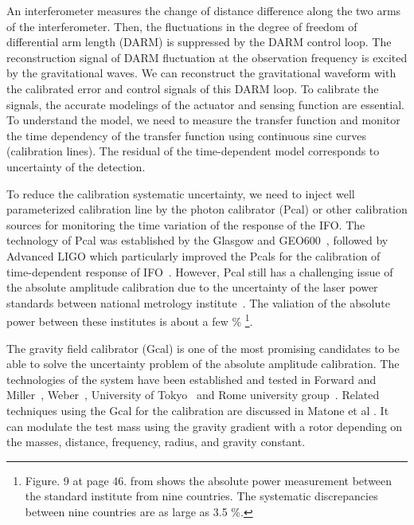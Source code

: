 \documentclass[A4]{spie}  %
\begin{document}

An interferometer measures the change of distance difference along the two arms of the interferometer. Then, the fluctuations in the degree of freedom of differential arm length (DARM) is suppressed by the DARM control loop. The reconstruction signal of DARM fluctuation at the observation frequency is excited by the gravitational waves. We can reconstruct the gravitational waveform with the calibrated error and control signals of this DARM loop. To calibrate the signals, the accurate modelings of the actuator and sensing function are essential. To understand the model, we need to measure the transfer function and monitor the time dependency of the transfer function using continuous sine curves (calibration lines). The residual of the time-dependent model corresponds to uncertainty of the detection.

To reduce the calibration systematic uncertainty, we need to inject well parameterized calibration line by the photon calibrator (Pcal) or other calibration sources for monitoring the time variation of the response of the IFO. The technology of Pcal was established by the Glasgow and GEO600~\cite{CLUBLEY200185,MOSSAVI20061}, followed by Advanced LIGO which particularly improved the Pcals for the calibration of time-dependent response of IFO~\cite{0264-9381-32-2-024001, doi:10.1063/1.4967303,0264-9381-27-8-084024,0264-9381-26-24-245011,0264-9381-32-2-024001}. However, Pcal still has a challenging issue of the absolute amplitude calibration due to the uncertainty of the laser power standards between national metrology institute~\cite{EUROMET}. The valiation of the absolute power between these institutes is about a few \% \footnote{Figure. 9 at page 46. from \cite{EUROMET} shows the absolute power measurement between the standard institute from nine countries. The systematic discrepancies between nine countries are as large as 3.5 \%.}.

The gravity field calibrator (Gcal) is one of the most promising candidates to be able to solve the uncertainty problem of the absolute amplitude calibration. The technologies of the system have been established and tested in Forward and Miller~\cite{doi:10.1063/1.1709366}, Weber~\cite{PhysRevLett.18.795,PhysRev.167.1145}, University of Tokyo~\cite{Hirakawa,1347-4065-19-3-L123,1347-4065-20-7-L498,PhysRevD.26.729,PhysRevD.32.342} and Rome university group~\cite{Astone1991}. Related techniques using the Gcal for the calibration are discussed in Matone et al \cite{0264-9381-24-9-005}. It can modulate the test mass using the gravity gradient with a rotor depending on the masses, distance, frequency, radius, and gravity constant. 
\end{document}
